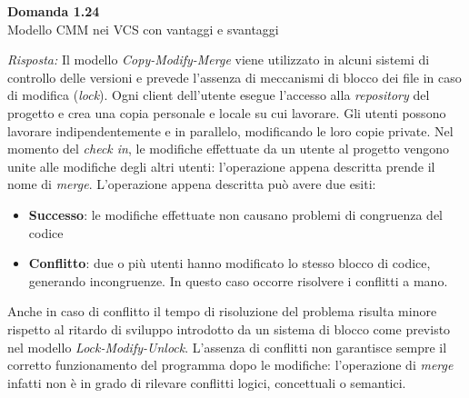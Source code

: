 \documentclass{article}
\newenvironment{problem}[2][Domanda]
    { \begin{mdframed}[backgroundcolor=gray!20] \textbf{#1 #2} \\}
    {  \end{mdframed}}
\newenvironment{solution}
    {\textit{Risposta:}}
    {}
\begin{document}
\begin{problem}{1.24}
Modello CMM nei VCS con vantaggi e svantaggi
\end{problem}
\begin{solution}
Il modello \textit{Copy-Modify-Merge} viene utilizzato in alcuni sistemi di controllo delle versioni e prevede l'assenza di meccanismi di blocco dei file in caso di modifica (\textit{lock}).
Ogni client dell'utente esegue l'accesso alla \textit{repository} del progetto e crea una copia personale e locale su cui lavorare. Gli utenti possono lavorare indipendentemente e in parallelo, modificando le loro copie private.
Nel momento del \textit{check in}, le modifiche effettuate da un utente al progetto vengono unite alle modifiche degli altri utenti: l'operazione appena descritta prende il nome di \textit{merge}.
L'operazione appena descritta può avere due esiti:
\begin{itemize}
	\item \textbf{Successo}: le modifiche effettuate non causano problemi di congruenza del codice
	\item \textbf{Conflitto}: due o più utenti hanno modificato lo stesso blocco di codice, generando incongruenze.
	\newline
	In questo caso occorre risolvere i conflitti a mano.
\end{itemize}
Anche in caso di conflitto il tempo di risoluzione del problema risulta minore rispetto al ritardo di sviluppo introdotto da un sistema di blocco come previsto nel modello \textit{Lock-Modify-Unlock}.
L'assenza di conflitti non garantisce sempre il corretto funzionamento del programma dopo le modifiche: l'operazione di \textit{merge} infatti non è in grado di rilevare conflitti logici, concettuali o semantici.
\end{solution}
\newpage
\end{document}

